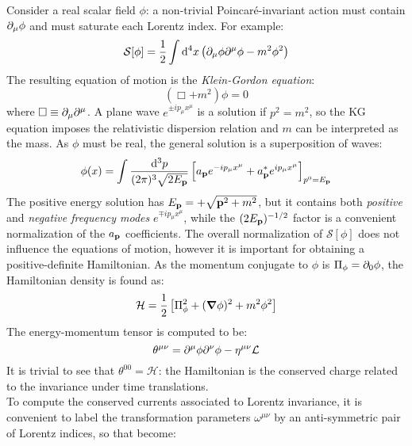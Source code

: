 Consider a real scalar field $ \phi $: a non-trivial Poincaré-invariant action must contain $ \partial_\mu \phi $ and must saturate each Lorentz index. For example:
\begin{equation}
  \mathcal{S}[\phi] = \frac{1}{2} \int \mathrm{d}^4 x \left( \partial_\mu \phi \partial^\mu \phi - m^2 \phi^2 \right)
\end{equation}
The resulting equation of motion is the \textit{Klein-Gordon equation}:
\begin{equation}
  \left( \Box + m^2 \right) \phi = 0
\end{equation}
where $ \Box \equiv \partial_\mu \partial^\mu $. A plane wave $ e^{\pm i p_\mu x^\mu} $ is a solution if $ p^2 = m^2 $, so the KG equation imposes the relativistic dispersion relation and $ m $ can be interpreted as the mass. As $ \phi $ must be real, the general solution is a superposition of waves:
\begin{equation}
  \phi(x) = \int \frac{\mathrm{d}^3 p}{(2\pi)^3 \sqrt{2E_{\mathbf{p}}}} \left[ a_{\mathbf{p}} e^{-i p_\mu x^\mu} + a^*_{\mathbf{p}} e^{i p_\mu x^\mu} \right]_{p^0 = E_{\mathbf{p}}}
  \label{eq:scalar-field-exp}
\end{equation}
The positive energy solution has $ E_{\mathbf{p}} = + \sqrt{\mathbf{p}^2 + m^2} $, but it contains both \textit{positive} and \textit{negative frequency modes} $ e^{\mp i p_\mu x^\mu} $, while the $ (2E_{\mathbf{p}})^{-1/2} $ factor is a convenient normalization of the $ a_{\mathbf{p}} $ coefficients. The overall normalization of $ \mathcal{S}[\phi] $ does not influence the equations of motion, however it is important for obtaining a positive-definite Hamiltonian. As the momentum conjugate to $ \phi $ is $ \Pi_\phi = \partial_0 \phi $, the Hamiltonian density is found as:
\begin{equation}
  \mathcal{H} = \frac{1}{2} \left[ \Pi_\phi^2 + (\boldsymbol{\nabla} \phi)^2 + m^2 \phi^2 \right]
  \label{eq:scalar-field-haml}
\end{equation}
The energy-momentum tensor is computed to be:
\begin{equation}
  \theta^{\mu \nu} = \partial^\mu \phi \partial^\nu \phi - \eta^{\mu \nu} \mathcal{L}
  \label{eq:scalar-field-en-mom-tens}
\end{equation}
It is trivial to see that $ \theta^{00} = \mathcal{H} $: the Hamiltonian is the conserved charge related to the invariance under time translations.\\
To compute the conserved currents associated to Lorentz invariance, it is convenient to label the transformation parameters $ \omega^{\mu \nu} $ by an anti-symmetric pair of Lorentz indices, so that  become:
